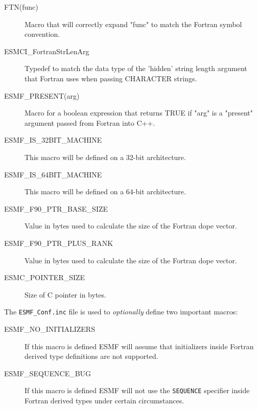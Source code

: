 \begin{description}

\item[FTN(func)]
Macro that will correctly expand "func" to match the Fortran symbol convention.

\item[ESMCI\_FortranStrLenArg]
Typedef to match the data type of the 'hidden' string length argument that
Fortran uses when passing CHARACTER strings.

\item[ESMF\_PRESENT(arg)]
Macro for a boolean expression that returns TRUE if "arg" is a "present"
argument passed from Fortran into C++.

\item[ESMF\_IS\_32BIT\_MACHINE]
This macro will be defined on a 32-bit architecture.

\item[ESMF\_IS\_64BIT\_MACHINE]
This macro will be defined on a 64-bit architecture.

\item[ESMF\_F90\_PTR\_BASE\_SIZE]
Value in bytes used to calculate the size of the Fortran dope vector.

\item[ESMF\_F90\_PTR\_PLUS\_RANK]
Value in bytes used to calculate the size of the Fortran dope vector.

\item[ESMC\_POINTER\_SIZE]
Size of C pointer in bytes.

\end{description}


The {\tt ESMF\_Conf.inc} file is used to {\em optionally} define two 
important macros:

\begin{description}

\item[ESMF\_NO\_INITIALIZERS]
If this macro is defined ESMF will assume that initializers inside 
Fortran derived type definitions are not supported.

\item[ESMF\_SEQUENCE\_BUG]
If this macro is defined ESMF will not use the {\tt SEQUENCE} specifier
inside Fortran derived types under certain circumstances.

\end{description}

